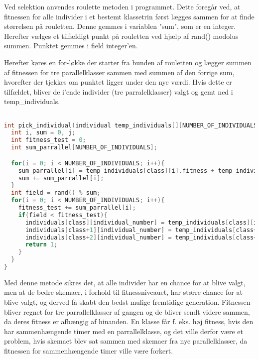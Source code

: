 Ved selektion anvendes roulette metoden i programmet. Dette foregår ved, at fitnessen for alle individer i et bestemt klassetrin først lægges sammen for at finde størrelsen på rouletten. Denne gemmes i variablen "sum", som er en integer. Herefter vælges et tilfældigt punkt på rouletten ved hjælp af rand() modolus summen. Punktet gemmes i field integer'en.

Herefter køres en for-løkke der starter fra bunden af rouletten og lægger summen af fitnessen for tre parallelklasser sammen med summen af den forrige sum, hvorefter der tjekkes om punktet ligger under den nye værdi. Hvis dette er tilfældet, bliver de i'ende individer (tre parralelklasser) valgt og gemt ned i temp\_individuals.  

\begin{lstlisting}[language = c]

int pick_individual(individual temp_individuals[][NUMBER_OF_INDIVIDUALS], individual individuals[][NUMBER_OF_INDIVIDUALS], int class, int individual_number){
  int i, sum = 0, j;
  int fitness_test = 0;
  int sum_parrallel[NUMBER_OF_INDIVIDUALS];

  for(i = 0; i < NUMBER_OF_INDIVIDUALS; i++){
    sum_parrallel[i] = temp_individuals[class][i].fitness + temp_individuals[class+1][i].fitness + temp_individuals[class+2][i].fitness;
    sum += sum_parrallel[i];
  }
  int field = rand() % sum;
  for(i = 0; i < NUMBER_OF_INDIVIDUALS; i++){
    fitness_test += sum_parrallel[i];
    if(field < fitness_test){
      individuals[class][individual_number] = temp_individuals[class][i];
      individuals[class+1][individual_number] = temp_individuals[class+1][i];
      individuals[class+2][individual_number] = temp_individuals[class+2][i];
      return 1;
    }
  } 
}

\end{lstlisting}

Med denne metode sikres det, at alle individer har en chance for at blive valgt, men at de bedre skemaer, i forhold til fitnessniveauet, har større chance for at blive valgt, og derved få skabt den bedst mulige fremtidige generation. Fitnessen bliver regnet for tre parrallelklasser af gangen og de bliver sendt videre sammen, da deres fitness er afhængig af hinanden. En klasse får f. eks. høj fitness, hvis den har sammenhængende timer med en parrallelklasse, og det ville derfor være et problem, hvis skemaet blev sat sammen med skemaer fra nye parallelklasser, da fitnessen for sammenhængende timer ville være forkert.